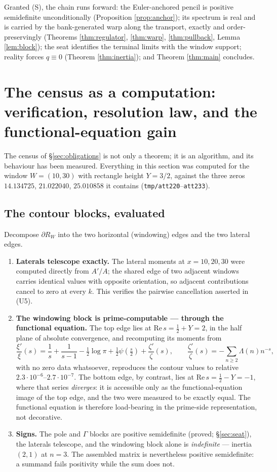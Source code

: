 \documentclass[11pt]{article}
\theoremstyle{plain}
\theoremstyle{definition}
\theoremstyle{remark}
\begin{document}
Granted (S), the chain runs forward: the Euler-anchored pencil is positive semidefinite
unconditionally (Proposition \ref{prop:anchor}); its spectrum is real and is carried by
the bank-generated warp along the transport, exactly and order-preservingly (Theorems
\ref{thm:regulator}, \ref{thm:warp}, \ref{thm:pullback}, Lemma \ref{lem:block}); the
seat identifies the terminal limits with the window support; reality forces $q\equiv0$
(Theorem \ref{thm:inertia}); and Theorem \ref{thm:main} concludes.

\section{The census as a computation: verification, resolution law, and the
functional-equation gain}\label{sec:computational}

The census of \S\ref{sec:obligations} is not only a theorem; it is an
algorithm, and its behaviour has been measured. Everything in this section was
computed for the window $W=(10,30)$ with rectangle height $Y=3/2$, against the
three zeros $14.134725$, $21.022040$, $25.010858$ it contains
(\texttt{tmp/att220}--\texttt{att233}).

\subsection{The contour blocks, evaluated}

Decompose $\partial R_W$ into the two horizontal (windowing) edges and the two
lateral edges.

\begin{enumerate}
\item[(a)] \textbf{Laterals telescope exactly.} The lateral moments at
$x=10,20,30$ were computed directly from $A'/A$; the shared edge of two
adjacent windows carries identical values with opposite orientation, so
adjacent contributions cancel to zero at every $k$. This verifies the
pairwise cancellation asserted in (U5).
\item[(b)] \textbf{The windowing block is prime-computable --- through the
functional equation.} The top edge lies at $\mathrm{Re}\,s=\tfrac12+Y=2$, in
the half plane of absolute convergence, and recomputing its moments from
\[
  \frac{\xi'}{\xi}(s)=\frac1s+\frac1{s-1}-\tfrac12\log\pi
    +\tfrac12\psi\!\left(\tfrac s2\right)+\frac{\zeta'}{\zeta}(s),
  \qquad \frac{\zeta'}{\zeta}(s)=-\sum_{n\ge2}\Lambda(n)n^{-s},
\]
with no zero data whatsoever, reproduces the contour values to relative
$2.3\cdot10^{-6}$--$2.7\cdot10^{-7}$. The bottom edge, by contrast, lies at
$\mathrm{Re}\,s=\tfrac12-Y=-1$, where that series \emph{diverges}: it is
accessible only as the functional-equation image of the top edge, and the two
were measured to be exactly equal. The functional equation is therefore
load-bearing in the prime-side representation, not decorative.
\item[(c)] \textbf{Signs.} The pole and $\Gamma$ blocks are positive
semidefinite (proved; \S\ref{sec:seat}), the laterals telescope, and the
windowing block alone is \emph{indefinite} --- inertia $(2,1)$ at $n=3$. The
assembled matrix is nevertheless positive semidefinite: a summand fails
positivity while the sum does not.
\end{enumerate}
\end{document}
